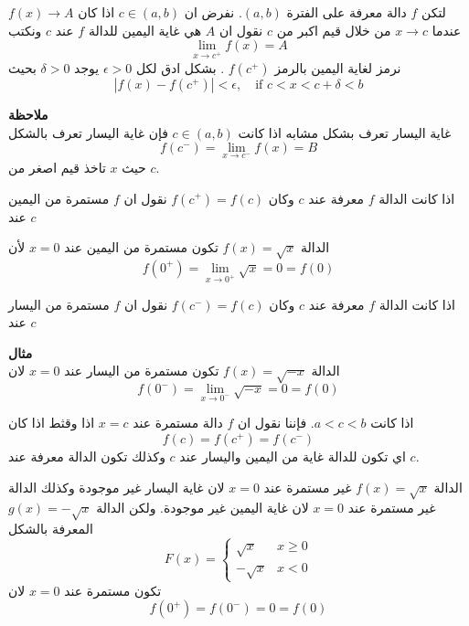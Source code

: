\begin{definition}
	لتكن $f$ دالة معرفة على الفترة $(a, b)$. نفرض ان $c\in (a,b)$ اذا كان
	$f(x) \to A$ عندما $x\to c$ من خلال قيم اكبر من $c$ نقول ان $A$ هي غاية اليمين للدالة $f$ عند $c$ ونكتب
	\[
	\lim\limits_{x \to c^+} f(x) = A
	\]
	نرمز لغاية اليمين بالرمز $f(c^+)$ . بشكل ادق لكل $\epsilon>0$ يوجد $\delta>0$ بحيث
	\[
	|f(x) - f(c^+)| < \epsilon, \quad \text{if}\,\, c<x<c+\delta<b
	\]
\end{definition}
\noindent
\textbf{ملاحظة}\\
غاية اليسار تعرف بشكل مشابه اذا كانت $c\in (a, b)$ فإن غاية اليسار تعرف بالشكل 
\[
	f(c^-) = \lim\limits_{x \to c^-} f(x) = B
\]
حيث $x$ تاخذ قيم اصغر من $c$.
\begin{definition} 
	اذا كانت الدالة $f$ معرفة عند $c$ وكان $f(c^+) = f(c)$ نقول ان $f$ مستمرة من اليمين عند $c$
\end{definition}

\begin{example}
	
الدالة $f(x) = \sqrt{x}$ تكون مستمرة من اليمين عند $x=0$ لأن
\[
f(0^+) = \lim\limits_{x \to 0^+} \sqrt{x} = 0 = f(0)
\]
\end{example}

\begin{definition} 
اذا كانت الدالة $f$ معرفة عند $c$ وكان $f(c^-) = f(c)$ نقول ان $f$ مستمرة من اليسار عند $c$
\end{definition}
\noindent
\textbf{مثال}\\
الدالة $f(x) = \sqrt{-x}$ تكون مستمرة من اليسار عند $x=0$ لان
\[
f(0^-) = \lim\limits_{x \to 0^-} \sqrt{-x} = 0 = f(0)
\]
\newpage
\begin{definition}
	اذا كانت $a<c<b$. فإننا نقول ان $f$ دالة مستمرة عند $x=c$ اذا وقثط اذا  كان
	\[
	f(c) = f(c^+) = f(c^-)
	\]
	اي تكون للدالة غاية من اليمين واليسار عند $c$ وكذلك تكون الدالة معرفة عند $c$.
\end{definition}

\begin{example}
الدالة $f(x) = \sqrt{x}$ غير مستمرة عند $x=0$ لان غاية اليسار غير موجودة وكذلك الدالة \\$ g(x) =- \sqrt{x}$ غير مستمرة عند $x=0$ لان غاية اليمين غير موجودة. ولكن الدالة المعرفة بالشكل
\[
F(x) = \begin{cases}
	\sqrt{x} & x\geq0 \\
	-\sqrt{x} & x < 0
\end{cases}
\]
تكون مستمرة عند $x=0$ لان
\[
f(0^+) = f(0^-) = 0 = f(0)
\]

\begin{figure}[H]
	\centering
\end{figure}
\end{example}
\newpage
